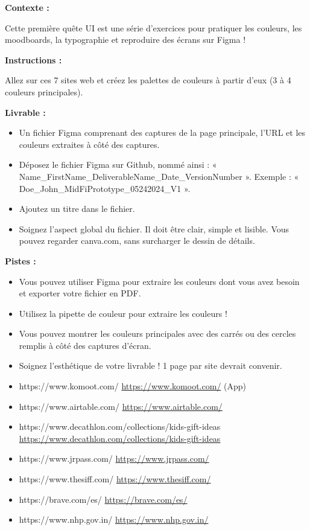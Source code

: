 \makeheaderfiles

\textbf{Contexte :}

Cette première quête UI est une série d'exercices pour pratiquer les couleurs, les moodboards, la typographie et reproduire des écrans sur Figma !

\textbf{Instructions :}

Allez sur ces 7 sites web et créez les palettes de couleurs à partir d'eux (3 à 4 couleurs principales).

\textbf{Livrable :}

\begin{itemize}
\item Un fichier Figma comprenant des captures de la page principale, l'URL et les couleurs extraites à côté des captures.
\item Déposez le fichier Figma sur Github, nommé ainsi : « Name\_FirstName\_DeliverableName\_Date\_VersionNumber ». Exemple : « Doe\_John\_MidFiPrototype\_05242024\_V1 ».
\item Ajoutez un titre dans le fichier.
\item Soignez l'aspect global du fichier. Il doit être clair, simple et lisible. Vous pouvez regarder canva.com, sans surcharger le dessin de détails.
\end{itemize}

\textbf{Pistes :}

\begin{itemize}
\item Vous pouvez utiliser Figma pour extraire les couleurs dont vous avez besoin et exporter votre fichier en PDF.
\item Utilisez la pipette de couleur pour extraire les couleurs !
\item Vous pouvez montrer les couleurs principales avec des carrés ou des cercles remplis à côté des captures d'écran.
\item Soignez l'esthétique de votre livrable ! 1 page par site devrait convenir.
\end{itemize}

\begin{itemize}
\item https://www.komoot.com/ \url{https://www.komoot.com/} (App)
\item https://www.airtable.com/ \url{https://www.airtable.com/}
\item https://www.decathlon.com/collections/kids-gift-ideas \url{https://www.decathlon.com/collections/kids-gift-ideas}
\item https://www.jrpass.com/ \url{https://www.jrpass.com/}
\item https://www.thesiff.com/ \url{https://www.thesiff.com/}
\item https://brave.com/es/ \url{https://brave.com/es/}
\item https://www.nhp.gov.in/ \url{https://www.nhp.gov.in/}
\end{itemize}

